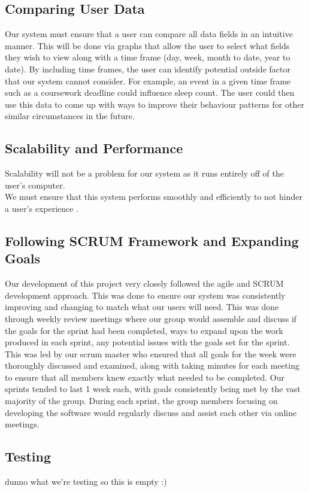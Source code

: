 \documentclass[12pt]{article}
\begin{document}
\subsection{Comparing User Data}
Our system must ensure that a user can compare all data fields in an intuitive manner. This will be done via graphs that allow the user to select what fields they wish to view along with a time frame (day, week, month to date, year to date).
By including time frames, the user can identify potential outside factor that our system cannot consider. For example, an event in a given time frame such as a coursework deadline could influence sleep count. The user could then use this data to come up with ways to improve their behaviour patterns for other similar circumstances in the future.

\subsection{Scalability and Performance}
Scalability will not be a problem for our system as it runs entirely off of the user's computer.\\

We must ensure that this system performs smoothly and efficiently to not hinder a user's experience .

\subsection{Following SCRUM Framework and Expanding Goals}
Our development of this project very closely followed the agile and SCRUM development approach. This was done to ensure our system was consistently improving and changing to match what our users will need. This was done through weekly review meetings where our group would assemble and discuss if the goals for the sprint had been completed, ways to expand upon the work produced in each sprint, any potential issues with the goals set for the sprint. This was led by our scrum master who ensured that all goals for the week were thoroughly discussed and examined, along with taking minutes for each meeting to ensure that all members knew exactly what needed to be completed. Our sprints tended to last 1 week each, with goals consistently being met by the vast majority of the group. During each sprint, the group members focusing on developing the software would regularly discuss and assist each other via online meetings.\\

\subsection{Testing}
dunno what we're testing so this is empty :)
\end{document}
